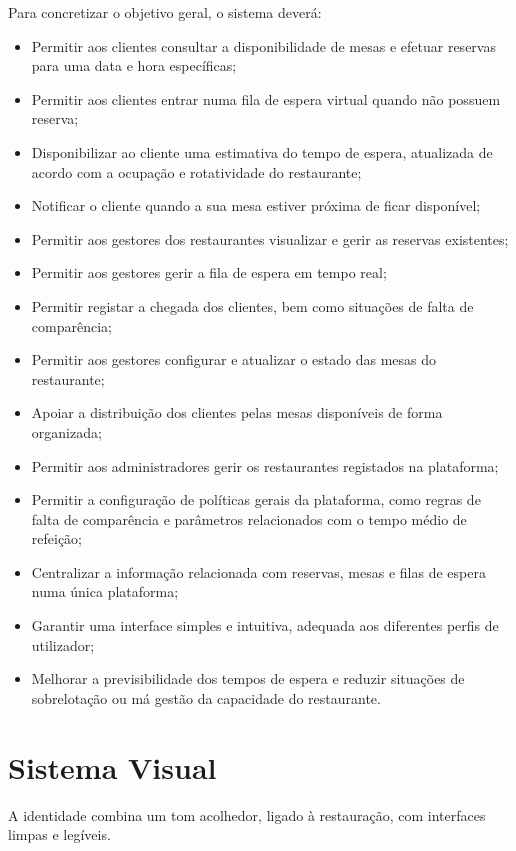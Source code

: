 Para concretizar o objetivo geral, o sistema deverá:
\begin{itemize}
    \item Permitir aos clientes consultar a disponibilidade de mesas e efetuar reservas para uma data e hora específicas;
    \item Permitir aos clientes entrar numa fila de espera virtual quando não possuem reserva;
    \item Disponibilizar ao cliente uma estimativa do tempo de espera, atualizada de acordo com a ocupação e rotatividade do restaurante;
    \item Notificar o cliente quando a sua mesa estiver próxima de ficar disponível;
    \item Permitir aos gestores dos restaurantes visualizar e gerir as reservas existentes;
    \item Permitir aos gestores gerir a fila de espera em tempo real;
    \item Permitir registar a chegada dos clientes, bem como situações de falta de comparência;
    \item Permitir aos gestores configurar e atualizar o estado das mesas do restaurante;
    \item Apoiar a distribuição dos clientes pelas mesas disponíveis de forma organizada;
    \item Permitir aos administradores gerir os restaurantes registados na plataforma;
    \item Permitir a configuração de políticas gerais da plataforma, como regras de falta de comparência e parâmetros relacionados com o tempo médio de refeição;
    \item Centralizar a informação relacionada com reservas, mesas e filas de espera numa única plataforma;
    \item Garantir uma interface simples e intuitiva, adequada aos diferentes perfis de utilizador;
    \item Melhorar a previsibilidade dos tempos de espera e reduzir situações de sobrelotação ou má gestão da capacidade do restaurante.
\end{itemize}

\section{Sistema Visual}\label{sec:sistema-visual}

A identidade combina um tom acolhedor, ligado à restauração, com interfaces limpas e legíveis.

